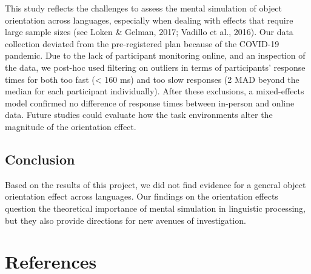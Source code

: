 \documentclass[
  man,floatsintext]{apa7}
\begin{document}
This study reflects the challenges to assess the mental simulation of
object orientation across languages, especially when dealing with
effects that require large sample sizes (see Loken \& Gelman, 2017; Vadillo et al., 2016). Our data collection deviated from
the pre-registered plan because of the COVID-19 pandemic. Due to the
lack of participant monitoring online, and an inspection of the data, we
post-hoc used filtering on outliers in terms of participants' response
times for both too fast (\textless{} 160 ms) and too slow responses (2 MAD beyond
the median for each participant individually). After these exclusions, a
mixed-effects model confirmed no difference of response times between
in-person and online data. Future studies could evaluate how the task
environments alter the magnitude of the orientation effect.

\hypertarget{conclusion}{%
\subsection{Conclusion}\label{conclusion}}

Based on the results of this project, we did not find evidence for a
general object orientation effect across languages. Our findings on the
orientation effects question the theoretical importance of mental
simulation in linguistic processing, but they also provide directions
for new avenues of investigation.

\newpage

\hypertarget{references}{%
\section{References}\label{references}}
\end{document}
